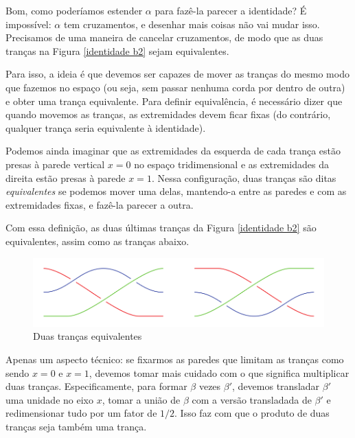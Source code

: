 	\par\vspace{0.3cm} Bom, como poderíamos estender $\alpha$ para fazê-la parecer a identidade? 
	É impossível: $\alpha$ tem cruzamentos, e desenhar mais coisas não vai mudar isso. Precisamos de uma 
	maneira de cancelar cruzamentos, de modo que as duas tranças na Figura \ref{identidade b2} 
	sejam equivalentes. 
	
	\par\vspace{0.3cm} Para isso, a ideia é que devemos ser capazes de mover as tranças do mesmo modo que 
	fazemos no espaço (ou seja, sem passar nenhuma corda por dentro de outra) e obter uma trança equivalente. 
	Para definir equivalência, é necessário dizer que quando movemos as tranças, as extremidades devem ficar 
	fixas (do contrário, qualquer trança seria equivalente à identidade).
	
	\par\vspace{0.3cm} Podemos ainda imaginar que as extremidades da esquerda de cada trança estão presas 
	à parede vertical $x=0$ no espaço tridimensional e as extremidades da direita estão presas à parede $x=1$.
	Nessa configuração, duas tranças são ditas \textit{equivalentes} se podemos mover uma delas, mantendo-a 
	entre as paredes e com as extremidades fixas, e fazê-la parecer a outra. 
	
	\par\vspace{0.3cm} Com essa definição, as duas últimas tranças da Figura \ref{identidade b2} 
	são equivalentes, assim como as tranças abaixo.
	\begin{figure}[H]
		\captionsetup{justification=centering}
		\begin{center}
			\includegraphics[width=12cm]{Images/fig_18_6.png}
		\end{center}\caption{Duas tranças equivalentes}\label{trancas equivalentes}
	\end{figure}   
	Apenas um aspecto técnico: se fixarmos as paredes que limitam as tranças como 
	sendo $x = 0$ e $x=1$, devemos tomar mais cuidado com o que significa multiplicar duas tranças.
	Especificamente, para formar $\beta$ vezes $\beta'$, devemos transladar $\beta'$ uma unidade no eixo $x$, 
	tomar a união de $\beta$ com a versão transladada de $\beta'$ e redimensionar tudo por um fator de $1/2$. 
	Isso faz com que o produto de duas tranças seja também uma trança.
	
